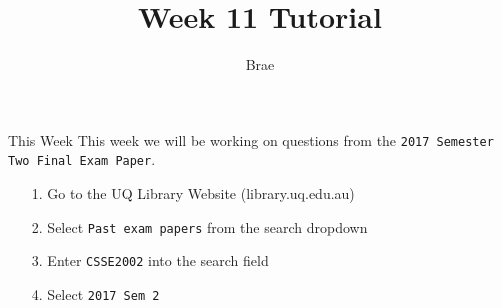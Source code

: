 

\title{Week 11 Tutorial}
\author{Brae}



\begin{frame}
\titlepage
\end{frame}

\begin{frame}[t, fragile]{This Week} \vspace{4pt}
This week we will be working on questions from the \texttt{2017 Semester Two Final Exam Paper}.\\[20pt]
\begin{enumerate}
	\item[1.] Go to the UQ Library Website (library.uq.edu.au)
	\item[2.] Select \texttt{Past exam papers} from the search dropdown
	\item[3.] Enter \texttt{CSSE2002} into the search field
	\item[4.] Select \texttt{2017 Sem 2}
\end{enumerate}
\end{frame}

